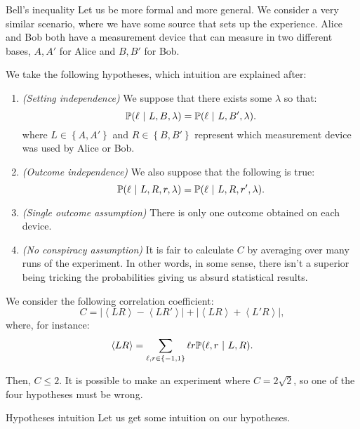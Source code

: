 \documentclass[a4paper]{article}
\begin{document}
\begin{parag}{Bell's inequality}
    Let us be more formal and more general. We consider a very similar scenario, where we have some source that sets up the experience. Alice and Bob both have a measurement device that can measure in two different bases, $A, A'$ for Alice and $B, B'$ for Bob. 

    We take the following hypotheses, which intuition are explained after:
    \begin{enumerate}
        \item \textit{(Setting independence)} We suppose that there exists some $\lambda$ so that: 
        \[\prob\left(\ell \suchthat L, B, \lambda\right) = \prob\left(\ell \suchthat L, B', \lambda\right).\]
        where $L \in \left\{A, A'\right\}$ and $R \in \left\{B, B'\right\}$ represent which measurement device was used by Alice or Bob.
        \item \textit{(Outcome independence)} We also suppose that the following is true:
        \[\prob\left(\ell \suchthat L, R, r, \lambda\right) = \prob\left(\ell \suchthat L, R, r', \lambda\right).\]
        \item \textit{(Single outcome assumption)} There is only one outcome obtained on each device.
        \item \textit{(No conspiracy assumption)} It is fair to calculate $C$ by averaging over many runs of the experiment. In other words, in some sense, there isn't a superior being tricking the probabilities giving us absurd statistical results.
    \end{enumerate}

    We consider the following correlation coefficient: 
    \[C = \left|\left\langle LR \right\rangle - \left\langle LR' \right\rangle\right| + \left|\left\langle LR \right\rangle + \left\langle L'R \right\rangle\right|,\]
    where, for instance: 
    \[\left\langle LR \right\rangle = \sum_{\ell, r \in \left\{-1, 1\right\}} \ell r \prob\left(\ell, r \suchthat L, R\right). \]

    Then, $C \leq 2$. It is possible to make an experiment where $C = 2 \sqrt{2}$, so one of the four hypotheses must be wrong.

    \begin{subparag}{Hypotheses intuition}
        Let us get some intuition on our hypotheses.
        

\end{subparag}
\end{parag}
\end{document}

